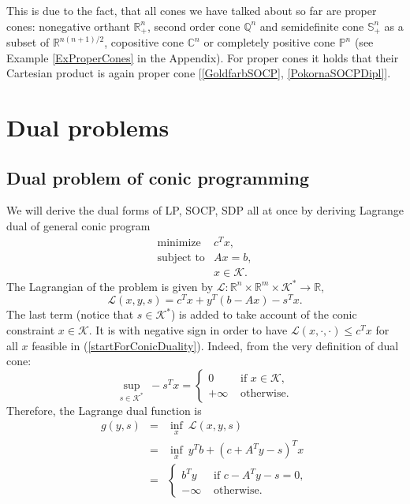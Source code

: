 \documentclass[12pt]{book}
\theoremstyle{definition}
\begin{document}
This is due to the fact, that all cones we have talked about so far are proper cones: nonegative orthant $\mathbb{R}^n_+$, second order cone $\mathbb{Q}^n$ and semidefinite cone $\mathbb{S}^n_+$ as a subset of $ \mathbb{R}^{n(n+1)/2}$, copositive cone $\mathbb{C}^n$ or completely positive cone $\mathbb{P}^n$ (see Example \ref{ExProperCones} in the Appendix). 
For proper cones it holds that their Cartesian product is again proper cone [\ref{GoldfarbSOCP}, \ref{PokornaSOCPDipl}].  

\section{Dual problems}


\subsection{Dual problem of conic programming}

We will derive the dual forms of LP, SOCP, SDP all at once by deriving Lagrange dual of general conic program
\begin{equation}
\label{startForConicDuality}
\begin{array}{ll}
\mbox{minimize} & c^Tx,\\
\mbox{subject to}& Ax = b,\\
& x \in \mathcal{K}.
\end{array} 
\end{equation}
The Lagrangian of the problem is given by $\mathcal{L}:\mathbb{R}^n\times\mathbb{R}^m\times\mathcal{K}^*\rightarrow \mathbb{R},$
\begin{equation*}
\mathcal{L}(x,y,s) = c^Tx + y^T(b-Ax) - s^Tx. %
\end{equation*}
The last term (notice that $s\in\mathcal{K}^*$) is added to take account of the conic constraint $x\in \mathcal{K}$.  
It is with negative sign in order to have $\mathcal{L}(x,\cdot,\cdot)\leq c^Tx$ for all $x$ feasible in (\ref{startForConicDuality}). 
Indeed, from the very definition of dual cone:
\begin{equation*}
\sup_{s\in \mathcal{K}^*} \ -s^Tx = 
\left\lbrace \begin{array}{ll} 
0 & \mbox{ if } x\in\mathcal{K},\\ 
+\infty & \mbox{ otherwise.}
\end{array}\right. 
\end{equation*}
Therefore, the Lagrange dual function is 
\begin{eqnarray*}
g(y,s) &=& \inf_x \ \mathcal{L}(x,y,s) \\
&=& \inf_x \ y^Tb + (c+A^Ty -s)^Tx \\
&=& \left\lbrace \begin{array}{ll} 
b^Ty & \mbox{ if } c-A^Ty - s = 0,\\ 
-\infty & \mbox{ otherwise.}
\end{array}\right. 
\end{eqnarray*}
\end{document}
